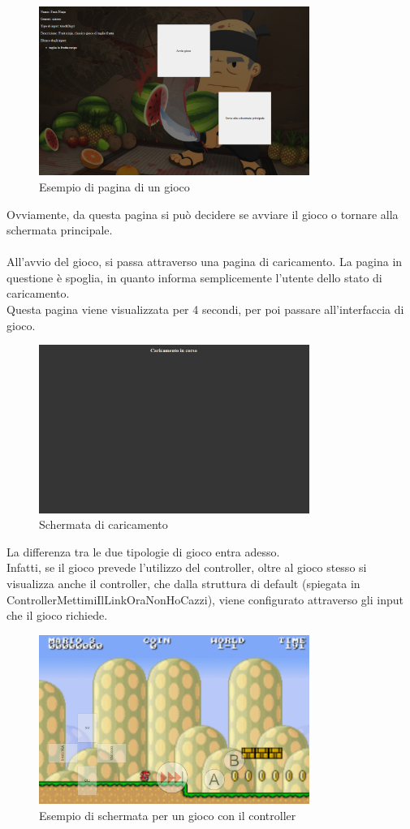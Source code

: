 \begin{figure}[h]
    \centering
    \includegraphics[width=250pt]{images/product/schermataPaginaGioco.png}
    \caption{Esempio di pagina di un gioco}
    \label{fig:schermataPaginaGioco}
\end{figure}
Ovviamente, da questa pagina si può decidere se avviare il gioco o tornare alla schermata principale.\\\\
All'avvio del gioco, si passa attraverso una pagina di caricamento. La pagina in questione è spoglia, in quanto informa semplicemente l'utente dello stato di caricamento.\\
Questa pagina viene visualizzata per 4 secondi, per poi passare all'interfaccia di gioco.
\begin{figure}[h]
    \centering
    \includegraphics[width=250pt]{images/product/schermataCaricamento.png}
    \caption{Schermata di caricamento}
    \label{fig:schermataCaricamento}
\end{figure}
\newpage
La differenza tra le due tipologie di gioco entra adesso.\\
Infatti, se il gioco prevede l'utilizzo del controller, oltre al gioco stesso si visualizza anche il controller, che dalla struttura di default (spiegata in ControllerMettimiIlLinkOraNonHoCazzi), viene configurato attraverso gli input che il gioco richiede.
\begin{figure}[h]
    \centering
    \includegraphics[width=250pt]{images/product/schermataGiocoController.png}
    \caption{Esempio di schermata per un gioco con il controller}
    \label{fig:schermataGiocoController}
\end{figure}
\newpage
